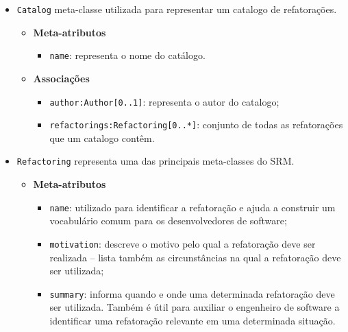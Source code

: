 \begin{itemize}
\item \texttt{Catalog} meta-classe utilizada para representar um catalogo de refatorações.

\begin{itemize}
	\item \textbf{Meta-atributos}
		\begin{itemize}
			\item \texttt{name}: representa o nome do catálogo. 
		\end{itemize}	
\end{itemize} 

\begin{itemize}
	\item \textbf{Associações}
		\begin{itemize}
			\item \texttt{author:Author[0..1]}: representa o autor do catalogo;
			\item \texttt{refactorings:Refactoring[0..*]}: conjunto de todas as refatorações que um catalogo contêm.
		\end{itemize}	
\end{itemize} 

\item \texttt{Refactoring} representa uma das principais meta-classes do SRM.

\begin{itemize}
	\item \textbf{Meta-atributos}
		\begin{itemize}
			\item \texttt{name}: utilizado para identificar a refatoração e ajuda a construir um vocabulário comum para os desenvolvedores de software;
			\item \texttt{motivation}: descreve o motivo pelo qual a refatoração deve ser realizada – lista também as circunstâncias na qual a refatoração deve ser utilizada;
			\item \texttt{summary}: informa quando e onde uma determinada refatoração deve ser utilizada. Também é útil para auxiliar o engenheiro de software a identificar uma refatoração relevante em uma determinada situação. 
		\end{itemize}	
\end{itemize} 


\end{itemize}
